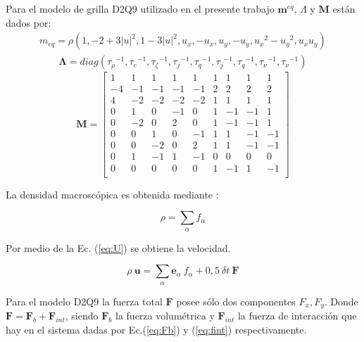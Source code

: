 Para el modelo de grilla D2Q9 utilizado en el presente trabajo $\mathbf{m}^{eq}$, $ \Lambda$ y $\mathbf{M}$ están dados por:
\begin{align}
m_{eq} =  \rho  \left( 1, - 2 + 3 {|u|}^{2} , 1 - 3{|u|}^{2} , u_{x} , - u_{x} , u_{y} , - u_{y} , {u_{x}}^{2} - {u_{y}}^{2} , u_{x} u_{y} \right) 
\label{eq:m}
\end{align}  
\begin{align}
    \mathbf{\Lambda}  = diag ( {\tau_{\rho }}^{-1},{\tau_{e}}^{-1},{\tau_{\zeta }}^{-1},{\tau_{j}}^{-1},{\tau_{q}}^{-1},{\tau_{j}}^{-1},{\tau_{q}}^{-1},{\tau_{\nu }}^{-1},{\tau_{\nu}}^{-1}) 
    \label{eq:lambda}
\end{align}
{\footnotesize
\begin{equation}
\mathbf{M} =
\begin{bmatrix}
1 & 1 & 1 & 1 & 1 & 1 & 1 & 1 & 1 \\
-4 &-1 &-1 &-1 &-1 & 2 & 2 & 2 & 2 \\
4 &-2 &-2 &-2 &-2 & 1 & 1 & 1 & 1 \\
0 & 1 & 0 &-1 & 0 & 1 &-1 &-1 & 1 \\
0 &-2 & 0 & 2 & 0 & 1 &-1 &-1 & 1 \\
0 & 0 & 1 & 0 &-1 & 1 & 1 &-1 &-1 \\
0 & 0 &-2 & 0 & 2 & 1 & 1 &-1 &-1 \\
0 & 1 &-1 & 1 &-1 & 0 & 0 & 0 & 0 \\    
0 & 0 & 0 & 0 & 0 & 1 &-1 & 1 &-1 \\        
\end{bmatrix}
\label{eq:matriz_m}
\end{equation}
}

La densidad macroscópica es obtenida mediante :

\begin{equation}
        \rho = \sum_{\alpha} f_{\alpha}
        \label{eq:rho}
\end{equation}

Por medio de la Ec. (\ref{eq:U}) se obtiene la velocidad.

\begin{equation}
    \rho \> \mathbf{u} = \sum_{\alpha} {\mathbf{e}}_{\alpha} \> f_{\alpha} + 0,5 \> {\delta}{t} \> \mathbf{F}
    \label{eq:U}
\end{equation}

Para el modelo D2Q9 la fuerza total $\mathbf{F}$ posee sólo dos componentes $F_{x} , F_{y}$. Donde $ {\mathbf{F}} = {\mathbf{F}}_{b} + {\mathbf{F}}_{int} $, siendo ${\mathbf{F}}_{b}$ la fuerza volumétrica y ${\mathbf{F}}_{int}$ la fuerza de interacción que hay en el sistema dadas por Ec.(\ref{eq:Fb}) y (\ref{eq:fint}) respectivamente.

